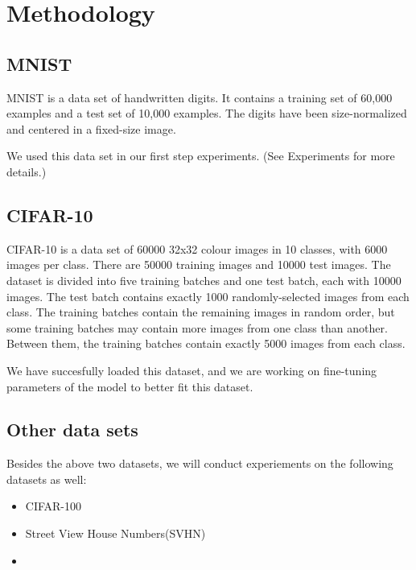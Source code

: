 \section{Methodology}
\label{sec:meth}



\subsection{MNIST}
MNIST is a data set of handwritten digits. It contains a training set of
60,000 examples and a test set of 10,000 examples. The digits have been
size-normalized and centered in a fixed-size image.

We used this data set in our first step experiments. (See Experiments for
more details.)

\subsection{CIFAR-10}
CIFAR-10 is a data set of 60000 32x32 colour images in 10 classes, with
6000 images per class. There are 50000 training images and 10000 test
images. The dataset is divided into five training batches and one test
batch, each with 10000 images. The test batch contains exactly 1000
randomly-selected images from each class. The training batches contain the
remaining images in random order, but some training batches may contain
more images from one class than another. Between them, the training
batches contain exactly 5000 images from each class.

We have succesfully loaded this dataset, and we are working on
fine-tuning parameters of the model to better fit this dataset.

\subsection{Other data sets}
Besides the above two datasets, we will conduct experiements on the
following datasets as well:
\begin{itemize}
\item CIFAR-100 \\
\item Street View House Numbers(SVHN)\\
\item
\end{itemize}


